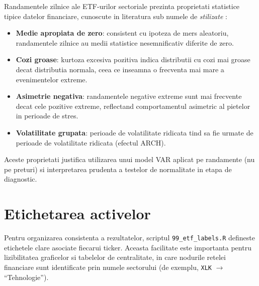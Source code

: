 Randamentele zilnice ale ETF-urilor sectoriale prezinta proprietati statistice
tipice datelor financiare, cunoscute in literatura sub numele de \textit{stilizate}
\citep{cont2001}:

\begin{itemize}
    \item \textbf{Medie apropiata de zero}: consistent cu ipoteza de mers
    aleatoriu, randamentele zilnice au medii statistice nesemnificativ diferite
    de zero.
    \item \textbf{Cozi groase}: kurtoza excesiva pozitiva indica distributii
    cu cozi mai groase decat distributia normala, ceea ce inseamna o frecventa
    mai mare a evenimentelor extreme.
    \item \textbf{Asimetrie negativa}: randamentele negative extreme sunt mai
    frecvente decat cele pozitive extreme, reflectand comportamentul asimetric
    al pietelor in perioade de stres.
    \item \textbf{Volatilitate grupata}: perioade de volatilitate ridicata
    tind sa fie urmate de perioade de volatilitate ridicata (efectul ARCH).
\end{itemize}

Aceste proprietati justifica utilizarea unui model VAR aplicat pe randamente
(nu pe preturi) si interpretarea prudenta a testelor de normalitate in etapa
de diagnostic.

\section{Etichetarea activelor}

Pentru organizarea consistenta a rezultatelor, scriptul \texttt{99\_etf\_labels.R}
defineste etichetele clare asociate fiecarui ticker. Aceasta facilitate este
importanta pentru lizibilitatea graficelor si tabelelor de centralitate, in care
nodurile retelei financiare sunt identificate prin numele sectorului (de exemplu,
\texttt{XLK} $\to$ ``Tehnologie'').